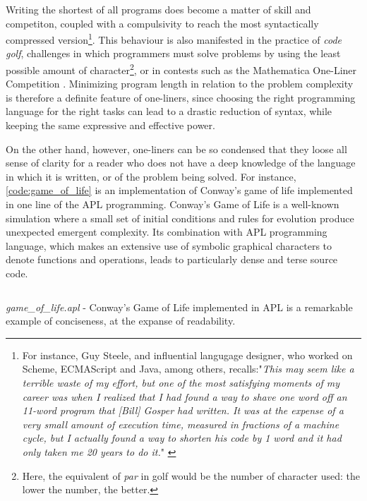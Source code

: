 Writing the shortest of all programs does become a matter of skill and competiton, coupled with a compulsivity to reach the most syntactically compressed version\footnote{For instance, Guy Steele, and influential langugage designer, who worked on Scheme, ECMAScript and Java, among others, recalls:"\emph{This may seem like a terrible waste of my effort, but one of the most satisfying moments of my career was when I realized that I had found a way to shave one word off an 11-word program that [Bill] Gosper had written. It was at the expense of a very small amount of execution time, measured in fractions of a machine cycle, but I actually found a way to shorten his code by 1 word and it had only taken me 20 years to do it.}" \citep{seibel_coders_2009}}.
This behaviour is also manifested in the practice of \emph{code golf}, challenges in which programmers must solve problems by using the least possible amount of character\footnote{Here, the equivalent of \emph{par} in golf would be the number of character used: the lower the number, the better.}, or in contests such as the Mathematica One-Liner Competition \citep{carlson_mathematica_2010}. Minimizing program length in relation to the problem complexity is therefore a definite feature of one-liners, since choosing the right programming language for the right tasks can lead to a drastic reduction of syntax, while keeping the same expressive and effective power.

On the other hand, however, one-liners can be so condensed that they loose all sense of clarity for a reader who does not have a deep knowledge of the language in which it is written, or of the problem being solved. For instance, \autoref{code:game_of_life} is an implementation of Conway's game of life implemented in one line of the APL programming. Conway's Game of Life is a well-known simulation where a small set of initial conditions and rules for evolution produce unexpected emergent complexity. Its combination with APL programming language, which makes an extensive use of symbolic graphical characters to denote functions and operations, leads to particularly dense and terse source code.

\begin{listing}
  \inputminted{text}{./corpus/game_of_life.apl}
  \caption{\emph{game\_of\_life.apl} - Conway's Game of Life implemented in APL is a remarkable example of conciseness, at the expanse of readability.}
  \label{code:game_of_life}
\end{listing}

